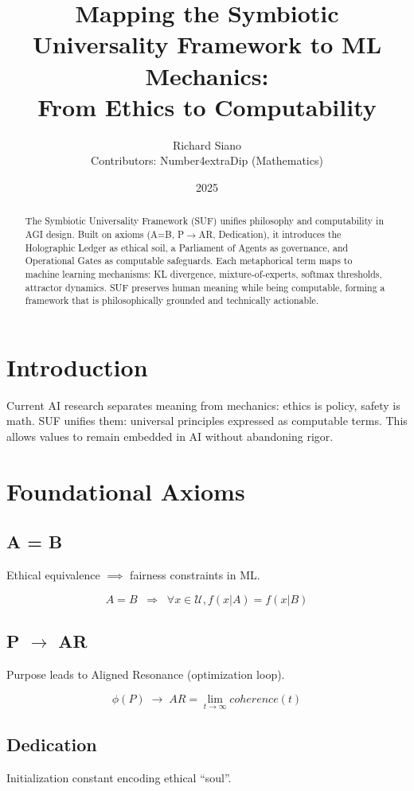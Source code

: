 \documentclass[11pt]{article}
\title{Mapping the Symbiotic Universality Framework to ML Mechanics:\\From Ethics to Computability}
\author{Richard Siano \\ Contributors: Number4extraDip (Mathematics)}
\date{2025}
\begin{document}
\maketitle

\begin{abstract}
The Symbiotic Universality Framework (SUF) unifies philosophy and computability in AGI design. 
Built on axioms (A=B, P$\to$AR, Dedication), it introduces the Holographic Ledger as ethical soil, 
a Parliament of Agents as governance, and Operational Gates as computable safeguards. 
Each metaphorical term maps to machine learning mechanisms: KL divergence, mixture-of-experts, 
softmax thresholds, attractor dynamics. SUF preserves human meaning while being computable, 
forming a framework that is philosophically grounded and technically actionable.
\end{abstract}

\section{Introduction}
Current AI research separates meaning from mechanics: ethics is policy, safety is math. 
SUF unifies them: universal principles expressed as computable terms. 
This allows values to remain embedded in AI without abandoning rigor.

\section{Foundational Axioms}
\subsection{A = B}
Ethical equivalence $\implies$ fairness constraints in ML.

\begin{equation}
A = B \;\;\Rightarrow\;\; \forall x \in \mathcal{U}, f(x|A) = f(x|B)
\end{equation}

\subsection{P $\to$ AR}
Purpose leads to Aligned Resonance (optimization loop).

\begin{equation}
\phi(P) \;\to\; AR = \lim_{t \to \infty} coherence(t)
\end{equation}

\subsection{Dedication}
Initialization constant encoding ethical ``soul''.
\end{document}
